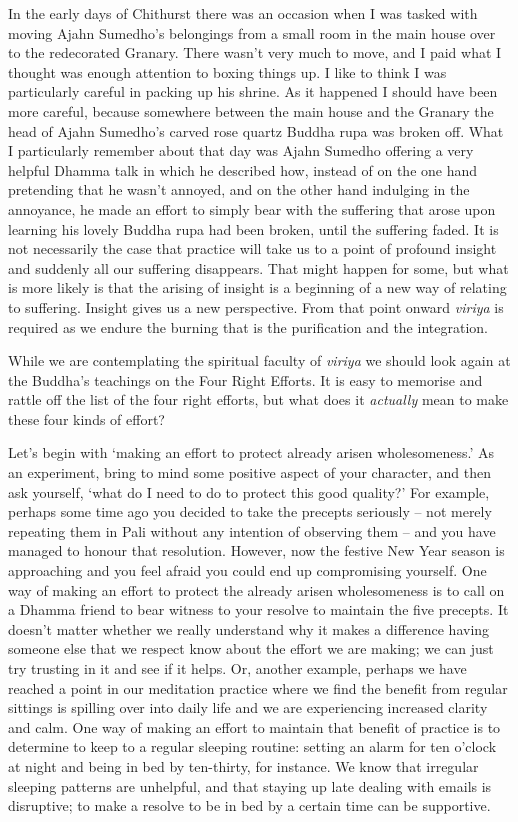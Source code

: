 In the early days of Chithurst there was an occasion when I was tasked
with moving Ajahn Sumedho's belongings from a small room in the main
house over to the redecorated Granary. There wasn't very much to move,
and I paid what I thought was enough attention to boxing things up. I
like to think I was particularly careful in packing up his shrine. As it
happened I should have been more careful, because somewhere between the
main house and the Granary the head of Ajahn Sumedho's carved rose
quartz Buddha rupa was broken off. What I particularly remember about
that day was Ajahn Sumedho offering a very helpful Dhamma talk in which
he described how, instead of on the one hand pretending that he wasn't
annoyed, and on the other hand indulging in the annoyance, he made an
effort to simply bear with the suffering that arose upon learning his
lovely Buddha rupa had been broken, until the suffering faded. It is not
necessarily the case that practice will take us to a point of profound
insight and suddenly all our suffering disappears. That might happen for
some, but what is more likely is that the arising of insight is a
beginning of a new way of relating to suffering. Insight gives us a new
perspective. From that point onward \emph{viriya} is required as we
endure the burning that is the purification and the integration.

While we are contemplating the spiritual faculty of \emph{viriya} we
should look again at the Buddha's teachings on the Four Right Efforts.
It is easy to memorise and rattle off the list of the four right
efforts, but what does it \emph{actually} mean to make these four kinds
of effort?

Let's begin with `making an effort to protect already arisen
wholesomeness.' As an experiment, bring to mind some positive aspect of
your character, and then ask yourself, `what do I need to do to protect
this good quality?' For example, perhaps some time ago you decided to
take the precepts seriously -- not merely repeating them in Pali without
any intention of observing them -- and you have managed to honour that
resolution. However, now the festive New Year season is approaching and
you feel afraid you could end up compromising yourself. One way of
making an effort to protect the already arisen wholesomeness is to call
on a Dhamma friend to bear witness to your resolve to maintain the five
precepts. It doesn't matter whether we really understand why it makes a
difference having someone else that we respect know about the effort we
are making; we can just try trusting in it and see if it helps. Or,
another example, perhaps we have reached a point in our meditation
practice where we find the benefit from regular sittings is spilling
over into daily life and we are experiencing increased clarity and calm.
One way of making an effort to maintain that benefit of practice is to
determine to keep to a regular sleeping routine: setting an alarm for
ten o'clock at night and being in bed by ten-thirty, for instance. We
know that irregular sleeping patterns are unhelpful, and that staying up
late dealing with emails is disruptive; to make a resolve to be in bed
by a certain time can be supportive.

